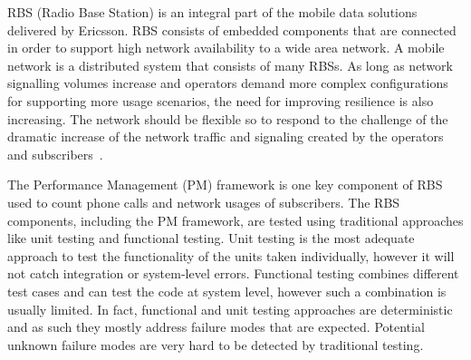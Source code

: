 RBS (Radio Base Station) is an integral part of the mobile data solutions delivered by Ericsson. RBS consists of embedded components that are connected  in order to support high network availability to a wide area network. A mobile network is a distributed system that consists of many RBSs. 
As long as network signalling volumes increase and operators demand more complex configurations for supporting more usage scenarios, the need for improving resilience is also increasing. The network should be flexible so to respond to the challenge of the dramatic increase of the network traffic and signaling created by the operators and subscribers~\cite{availability}.

The Performance Management (PM) framework is one key component of RBS used to count phone calls and network usages of subscribers. 
The RBS components, including the PM framework, are tested using traditional  approaches  like unit testing and functional testing.  Unit  testing  is the most adequate approach to test the functionality of the units taken individually, however it will not catch integration or system-level errors. Functional testing combines different test cases and can test the code at system level, however such a combination is usually limited. In fact, functional and unit testing approaches are deterministic and as such they mostly address failure modes that are expected. Potential unknown failure modes are very hard to be detected by traditional testing.

